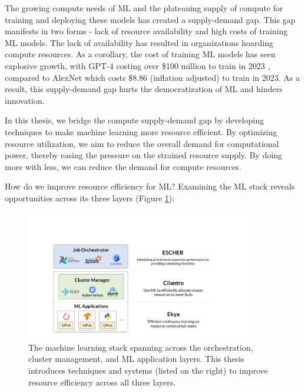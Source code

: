The growing compute needs of ML and the plateauing supply of compute for training and deploying these models has created a supply-demand gap. This gap manifests in two forms - lack of resource availability and high costs of training ML models. The lack of availability \cite{gpuavailabilitywsj,gpuavailabilitytheinformation,gpuavailabilitywired} has resulted in organizations hoarding compute resources. As a corollary, the cost of training ML models has seen explosive growth, with GPT-4 costing over \$100 million to train in 2023 \cite{gpt4traincost}, compared to AlexNet which costs \$8.86 (inflation adjusted) to train in 2023\cite{mlmodelcost}. As a result, this supply-demand gap hurts the democratization of ML and hinders innovation.

In this thesis, we bridge the compute supply-demand gap by developing techniques to make machine learning more resource efficient. By optimizing resource utilization, we aim to reduce the overall demand for computational power, thereby easing the pressure on the strained resource supply. By doing more with less, we can reduce the demand for compute resources. 

How do we improve resource efficiency for ML? Examining the ML stack reveals opportunities across its three layers (Figure \ref{fig:ml_stack}):

\begin{figure}
    \centering
    \includegraphics[width=0.9\textwidth]{intro/figures/MLStack.pdf}
    \caption{The machine learning stack spanning across the orchestration, cluster management, and ML application layers. This thesis introduces techniques and systems (listed on the right) to improve resource efficiency across all three layers.}
    \label{fig:ml_stack}
\end{figure}


